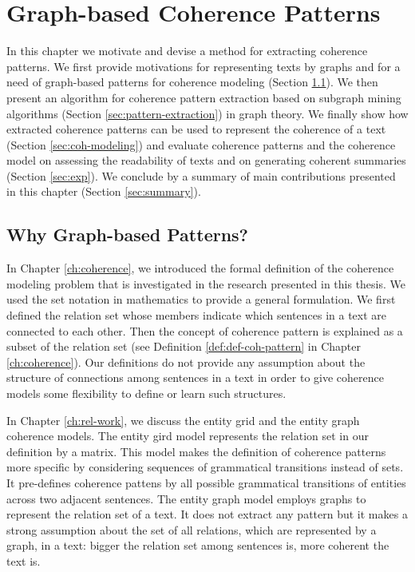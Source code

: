 
\chapter{Graph-based Coherence Patterns}
\label{ch:coh-patterns}

In this chapter we motivate and devise a method for extracting coherence patterns.  
We first provide motivations for representing texts by graphs and for a need of graph-based patterns for coherence modeling (Section \ref{sec:motivation}).  
We then present an algorithm for coherence pattern extraction based on subgraph mining algorithms (Section \ref{sec:pattern-extraction}) in graph theory.  
We finally show how extracted coherence patterns can be used to represent the coherence of a text (Section \ref{sec:coh-modeling}) and evaluate coherence patterns and the coherence model on assessing the readability of texts and on generating coherent summaries (Section \ref{sec:exp}). 
We conclude by a summary of main contributions presented in this chapter (Section \ref{sec:summary}). 

\section{Why Graph-based Patterns?}
\label{sec:motivation}

In Chapter \ref{ch:coherence}, we introduced the formal definition of the coherence modeling problem that is investigated in the research presented in this thesis. 
We used the set notation in mathematics to provide a general formulation. 
We first defined the relation set whose members indicate which sentences in a text are connected to each other. 
Then the concept of coherence pattern is explained as a subset of the relation set (see Definition \ref{def:def-coh-pattern} in Chapter \ref{ch:coherence}). 
Our definitions do not provide any assumption about the structure of connections among sentences in a text in order to give coherence models some flexibility to define or learn such structures. 

In Chapter \ref{ch:rel-work}, we discuss the entity grid 
\cite{barzilay05a,barzilay08} and the entity graph 
\cite{guinaudeau13} coherence models. 
The entity gird model represents the relation set in our definition by a matrix. 
This model makes the definition of coherence patterns more specific by considering sequences of grammatical transitions instead of sets.  
It pre-defines coherence pattens by all possible grammatical transitions of entities across two adjacent sentences. 
The entity graph model employs graphs to represent the relation set of a text.  
It does not extract any pattern but it makes a strong assumption about the set of all relations, which are represented by a graph, in a text:
bigger the relation set among sentences is, more coherent the text is. 


